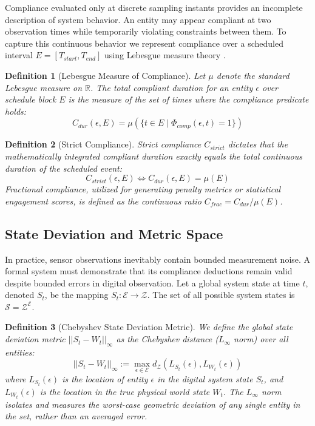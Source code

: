 \documentclass[conference]{IEEEtran}
\newtheorem{definition}{Definition}
\newcommand{\E}{\mathcal{E}} %
\newcommand{\Z}{\mathcal{Z}} %
\newcommand{\Sstate}{\mathcal{S}} %
\begin{document}
Compliance evaluated only at discrete sampling instants provides an incomplete description of system behavior. An entity may appear compliant at two observation times while temporarily violating constraints between them. To capture this continuous behavior we represent compliance over a scheduled interval $E=[T_{start},T_{end}]$ using Lebesgue measure theory \cite{b12,b20}.

\begin{definition}[Lebesgue Measure of Compliance]
Let $\mu$ denote the standard Lebesgue measure on $\mathbb{R}$. The total compliant duration for an entity $\epsilon$ over schedule block $E$ is the measure of the set of times where the compliance predicate holds:
\begin{equation}
C_{dur}(\epsilon, E) = \mu(\{ t \in E \mid \Phi_{comp}(\epsilon, t) = 1 \})
\end{equation}
\end{definition}

\begin{definition}[Strict Compliance]
Strict compliance $C_{strict}$ dictates that the mathematically integrated compliant duration exactly equals the total continuous duration of the scheduled event:
\begin{equation}
C_{strict}(\epsilon, E) \iff C_{dur}(\epsilon, E) = \mu(E)
\end{equation}
Fractional compliance, utilized for generating penalty metrics or statistical engagement scores, is defined as the continuous ratio $C_{frac} = C_{dur} / \mu(E)$.
\end{definition}

\subsection{State Deviation and Metric Space}

In practice, sensor observations inevitably contain bounded measurement noise. A formal system must demonstrate that its compliance deductions remain valid despite bounded errors in digital observation. Let a global system state at time $t$, denoted $S_t$, be the mapping $S_t: \E \to \Z$. The set of all possible system states is $\Sstate = \Z^\E$.

\begin{definition}[Chebyshev State Deviation Metric]
We define the global state deviation metric $||S_t - W_t||_\infty$ as the Chebyshev distance ($L_\infty$ norm) over all entities:
\begin{equation}
||S_t - W_t||_\infty := \max_{\epsilon \in \E} d_\Z(L_{S_t}(\epsilon), L_{W_t}(\epsilon))
\end{equation}
where $L_{S_t}(\epsilon)$ is the location of entity $\epsilon$ in the digital system state $S_t$, and $L_{W_t}(\epsilon)$ is the location in the true physical world state $W_t$. The $L_\infty$ norm isolates and measures the worst-case geometric deviation of any single entity in the set, rather than an averaged error.
\end{definition}
\end{document}
